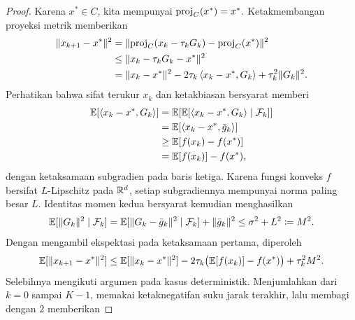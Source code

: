 \begin{proof}
    Karena $x^*\in C$, kita mempunyai $\mathrm{proj}_C(x^*)=x^*$. Ketakmembangan proyeksi metrik memberikan
    \begin{equation}
        \begin{aligned}
            \|x_{k+1}-x^*\|^2
            &= \|\mathrm{proj}_C(x_{k}-\tau_k G_k)-\mathrm{proj}_C(x^*)\|^2\\
            &\leq \|x_{k}-\tau_k G_k-x^*\|^2\\
            &= \|x_{k}-x^*\|^2 - 2\tau_k\left\langle x_k-x^* , G_k\right\rangle + \tau_k^2\|G_k\|^2.
        \end{aligned}
    \end{equation}
    Perhatikan bahwa sifat terukur $x_k$ dan ketakbiasan bersyarat memberi
    \begin{equation}
        \begin{aligned}
            \mathbb{E}[\left\langle x_k-x^* , G_k\right\rangle]
            &= \mathbb{E}\!\left[\mathbb{E}[\left\langle x_k-x^* , G_k\right\rangle\mid\mathcal F_k]\right]\\
            &= \mathbb{E}[\left\langle x_k-x^* , \bar g_k\right\rangle]\\
            &\geq \mathbb{E}[f(x_k)-f(x^*)]\\
            &= \mathbb{E}[f(x_k)]-f(x^*),
        \end{aligned}
    \end{equation}
    dengan ketaksamaan subgradien pada baris ketiga. Karena fungsi konveks $f$ bersifat $L$-Lipschitz pada $\mathbb{R}^d$, setiap subgradiennya mempunyai norma paling besar $L$. Identitas momen kedua bersyarat kemudian menghasilkan
    \begin{equation}
        \mathbb{E}[\|G_k\|^2\mid\mathcal F_k]
        = \mathbb{E}[\|G_k-\bar g_k\|^2\mid\mathcal F_k]+\|\bar g_k\|^2
        \leq \sigma^2+L^2\coloneqq M^2.
    \end{equation}
    Dengan mengambil ekspektasi pada ketaksamaan pertama, diperoleh
    \begin{equation}
        \begin{aligned}
            \mathbb{E}[\|x_{k+1}-x^*\|^2]
            \leq \mathbb{E}[\|x_k-x^*\|^2]
            -2\tau_k\big(\mathbb{E}[f(x_k)]-f(x^*)\big)
            +\tau_k^2M^2.
        \end{aligned}
    \end{equation}
    Selebihnya mengikuti argumen pada kasus deterministik. Menjumlahkan dari $k=0$ sampai $K-1$, memakai ketaknegatifan suku jarak terakhir, lalu membagi dengan $2$ memberikan

\end{proof}
